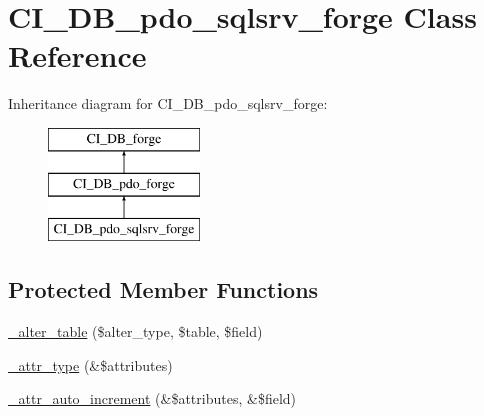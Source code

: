 \hypertarget{class_c_i___d_b__pdo__sqlsrv__forge}{}\section{C\+I\+\_\+\+D\+B\+\_\+pdo\+\_\+sqlsrv\+\_\+forge Class Reference}
\label{class_c_i___d_b__pdo__sqlsrv__forge}
Inheritance diagram for C\+I\+\_\+\+D\+B\+\_\+pdo\+\_\+sqlsrv\+\_\+forge\+:\begin{figure}[H]
\begin{center}
\leavevmode
\includegraphics[height=3.000000cm]{class_c_i___d_b__pdo__sqlsrv__forge}
\end{center}
\end{figure}
\subsection*{Protected Member Functions}
\begin{DoxyCompactItemize}
\item 
\mbox{\hyperlink{class_c_i___d_b__pdo__sqlsrv__forge_ada38b9f9d156c7e09ba66bb94c5de4d1}{\+\_\+alter\+\_\+table}} (\$alter\+\_\+type, \$table, \$field)
\item 
\mbox{\hyperlink{class_c_i___d_b__pdo__sqlsrv__forge_a5a041ab99ac9a3cd62c7d4bc19e8b978}{\+\_\+attr\+\_\+type}} (\&\$attributes)
\item 
\mbox{\hyperlink{class_c_i___d_b__pdo__sqlsrv__forge_a9f3b1286bb4f147950c7ec8efd35be53}{\+\_\+attr\+\_\+auto\+\_\+increment}} (\&\$attributes, \&\$field)
\end{DoxyCompactItemize}
